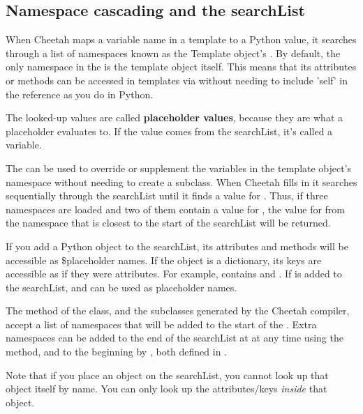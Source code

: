 \subsection{Namespace cascading and the searchList}
\label{language.searchList}

When Cheetah maps a variable name in a template to a Python value, it searches
through a list of namespaces known as the Template object's .
By default, the only namespace in the  is the template object
itself. This means that its attributes or methods can be accessed in templates
via  without needing to include 'self' in the reference as
you do in Python. 

The looked-up values are called {\bf placeholder values}, because they are what
a placeholder evaluates to.  If the value comes from the searchList, it's called
a  variable.

The  can be used to override or supplement the variables in the
template object's namespace without needing to create a subclass.  When Cheetah
fills in  it searches sequentially through the searchList until it
finds a value for .  Thus, if three namespaces are loaded and two of
them contain a value for , the value for  from the
namespace that is closest to the start of the searchList will be returned.

If you add a Python object to the searchList, its attributes and methods will
be accessible as \$placeholder names.  If the object is a dictionary, its keys
are accessible as if they were attributes.  For example, 
contains  and .  If  is added to
the searchList,  and  can be used as
placeholder names.

The method of the  class, and the subclasses
generated by the Cheetah compiler, accept a list of namespaces that will be
added to the start of the .  Extra namespaces can be added to
the end of the searchList at at any time using the
 method, and to the beginning by
, both defined in .

Note that if you place an object on the searchList, you cannot look up that
object itself by name.  You can only look up the attributes/keys {\em inside}
that object.



